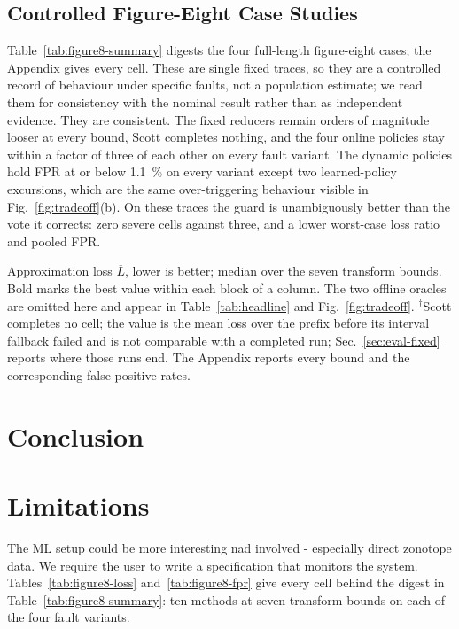 \documentclass[letterpaper, 10 pt, conference]{ieeeconf}  %
\newcommand{\tablenote}[1]{%
  \par\vspace{3pt}%
  \begin{minipage}{\linewidth}\footnotesize\raggedright #1\end{minipage}%
}
\begin{document}
\subsection{Controlled Figure-Eight Case Studies}
\label{sec:eval-fixed-traces}
Table~\ref{tab:figure8-summary} digests the four full-length figure-eight cases; the Appendix gives every cell.
These are single fixed traces, so they are a controlled record of behaviour under specific faults, not a population estimate; we read them for consistency with the nominal result rather than as independent evidence.
They are consistent.
The fixed reducers remain orders of magnitude looser at every bound, Scott completes nothing, and the four online policies stay within a factor of three of each other on every fault variant.
The dynamic policies hold FPR at or below \SI{1.1}{\percent} on every variant except two learned-policy excursions, which are the same over-triggering behaviour visible in Fig.~\ref{fig:tradeoff}(b).
On these traces the guard is unambiguously better than the vote it corrects: zero severe cells against three, and a lower worst-case loss ratio and pooled FPR.

\begin{table}[t]
  \centering
  \caption{Figure-eight fault variants, median over the seven bounds}
  \label{tab:figure8-summary}
  \footnotesize
  \setlength{\tabcolsep}{2.5pt}
  
  \tablenote{
    Approximation loss $\overline{L}$, lower is better; median over the seven
        transform bounds. Bold marks the best value within each block of a
        column. The two offline oracles are omitted here and appear in
        Table~\ref{tab:headline} and Fig.~\ref{fig:tradeoff}.
        $^{\dagger}$Scott completes no cell; the value is the mean loss over the
        prefix before its interval fallback failed and is not comparable with a
        completed run; Sec.~\ref{sec:eval-fixed} reports where those runs end.
        The Appendix reports every bound and the
        corresponding false-positive rates.
  }
\end{table}

\section{Conclusion}
\section{Limitations}
The ML setup could be more interesting nad involved - especially direct zonotope data. We require the user to write a specification that monitors the system.
Tables~\ref{tab:figure8-loss} and~\ref{tab:figure8-fpr} give every cell behind
the digest in Table~\ref{tab:figure8-summary}: ten methods at seven transform
bounds on each of the four fault variants.
\end{document}
